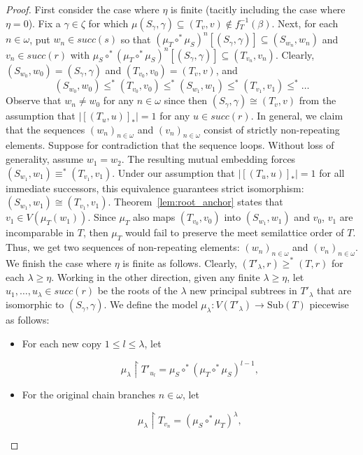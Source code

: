 \documentclass[12pt]{amsart}
\numberwithin{mytheorem}{section} %
\numberwithin{mylemma}{section} %
\numberwithin{mycorollary}{section} %
\begin{document}
\begin{proof}
First consider the case where $\eta$ is finite (tacitly including the case where $\eta = 0$). Fix a $\gamma \in \zeta$ for which $\mu(S_\gamma,\gamma) \subseteq (T_v,v)\not \in f_T^{-1}(\beta)$. Next, for each $n\in \omega$, put $w_n \in succ(s)$ so that $(\mu_T\circ^*\mu_S)^n[(S_\gamma,\gamma)] \subseteq (S_{w_n}, w_n)$ and $v_n\in succ(r)$ with $\mu_S\circ^*(\mu_T\circ^*\mu_S)^n[(S_\gamma,\gamma)] \subseteq (T_{v_n}, v_n)$. Clearly, $(S_{w_0},w_0) = (S_\gamma,\gamma)$ and $(T_{v_0}, v_0) = (T_v, v)$, and 
\[
(S_{w_0},w_0) \leq^* (T_{v_0},v_0) \leq^*(S_{w_1},w_1) \leq^*(T_{v_1},v_1) \leq^* \ldots
\]
 Observe that $w_n \not = w_0$ for any $n\in \omega$ since then $(S_\gamma, \gamma) \cong (T_v,v)$ from the assumption that $|[(T_u, u)]_*| =1$ for any $u \in succ(r)$. In general, we claim that the sequences $(w_n)_{n \in \omega}$ and $(v_n)_{n \in \omega}$ consist of strictly non-repeating elements. Suppose for contradiction that the sequence loops. Without loss of generality, assume $w_1 = w_2$. The resulting mutual embedding forces $(S_{w_1}, w_1) \equiv^* (T_{v_1}, v_1)$. Under our assumption that $|[(T_u, u)]_*| = 1$ for all immediate successors, this equivalence guarantees strict isomorphism: $(S_{w_1}, w_1) \cong (T_{v_1}, v_1)$. Theorem~\ref{lem:root_anchor} states that $v_1 \in V(\mu_T(w_1))$. Since $\mu_T$ also maps $(T_{v_0},v_0)$ into $(S_{w_1}, w_1)$ and $v_0$, $v_1$ are incomparable in $T$, then $\mu_T$ would fail to preserve the meet semilattice order of $T$. Thus, we get two sequences of non-repeating elements: $(w_n)_{n\in\omega}$ and $(v_n)_{n\in\omega}$. \\

\noindent
We finish the case where $\eta$ is finite as follows. Clearly, $(T'_{\lambda}, r) \geq^* (T,r)$ for each $\lambda \geq \eta$. Working in the other direction, given any finite $\lambda \geq \eta$, let $u_1, \dots, u_\lambda \in succ(r)$ be the roots of the $\lambda$ new principal subtrees in $T'_\lambda$ that are isomorphic to $(S_\gamma, \gamma)$. We define the model $\mu_\lambda: V(T'_{\lambda}) \to \text{Sub}(T)$ piecewise as follows:
\begin{itemize}
\item For each new copy $1 \leq l \leq \lambda$, let 

\[
\mu_\lambda \restriction T'_{u_l} = \mu_S \circ^* (\mu_T \circ^* \mu_S)^{l-1},
\]

\item For the original chain branches $n \in \omega$, let 

\[
\mu_\lambda \restriction T_{v_n} = (\mu_S \circ^* \mu_T)^{\lambda},
\]


\end{itemize}
\end{proof}
\end{document}
